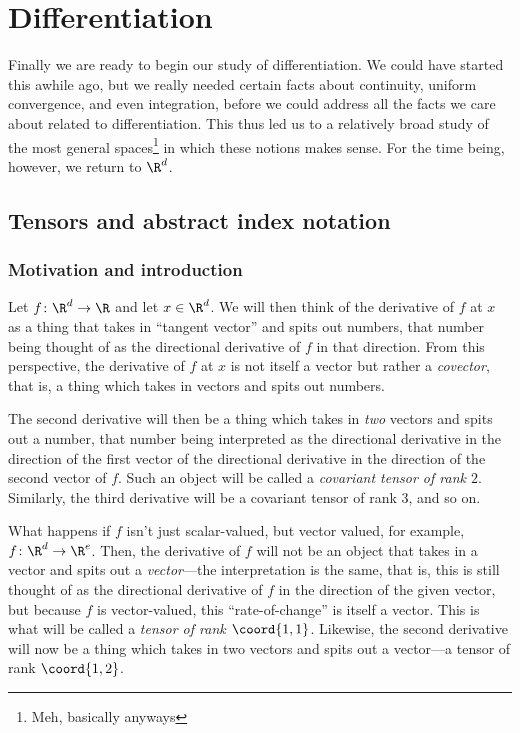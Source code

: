 \chapter{Differentiation}\label{chp5x}

Finally we are ready to begin our study of differentiation.  We could have started this awhile ago, but we really needed certain facts about continuity, uniform convergence, and even integration, before we could address all the facts we care about related to differentiation.  This thus led us to a relatively broad study of the most general spaces\footnote{Meh, basically anyways} in which these notions makes sense.  For the time being, however, we return to $\R ^d$.

\section{Tensors and abstract index notation}

\subsection{Motivation and introduction}

Let $f\colon \R ^d\rightarrow \R$ and let $x\in \R ^d$.  We will then think of the derivative of $f$ at $x$ as a thing that takes in ``tangent vector'' and spits out numbers, that number being thought of as the directional derivative of $f$ in that direction.  From this perspective, the derivative of $f$ at $x$ is not itself a vector but rather a \emph{covector}, that is, a thing which takes in vectors and spits out numbers.

The second derivative will then be a thing which takes in \emph{two} vectors and spits out a number, that number being interpreted as the directional derivative in the direction of the first vector of the directional derivative in the direction of the second vector of $f$.  Such an object will be called a \emph{covariant tensor of rank $2$}.  Similarly, the third derivative will be a covariant tensor of rank $3$, and so on.

What happens if $f$ isn't just scalar-valued, but vector valued, for example, $f\colon \R ^d\rightarrow \R ^e$.  Then, the derivative of $f$ will not be an object that takes in a vector and spits out a \emph{vector}---the interpretation is the same, that is, this is still thought of as the directional derivative of $f$ in the direction of the given vector, but because $f$ is vector-valued, this ``rate-of-change'' is itself a vector.  This is what will be called a \emph{tensor of rank $\coord{1,1}$}.  Likewise, the second derivative will now be a thing which takes in two vectors and spits out a vector---a tensor of rank $\coord{1,2}$.

